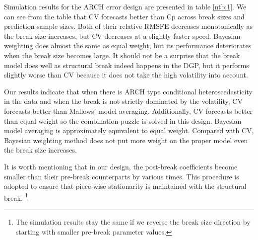 Simulation results for the ARCH error design are presented in table \ref{ntb:1}. We can see from the table that CV forecasts better than Cp across break sizes and prediction sample sizes. Both of their relative RMSFE decreases monotonically as the break size increases, but CV decreases at a slightly faster speed. Bayesian weighting does almost the same as equal weight, but its performance deteriorates when the break size becomes large. It should not be a surprise that the break model does well as structural break indeed happens in the DGP, but it performs slightly worse than CV because it does not take the high volatility into account.

Our results indicate that when there is ARCH type conditional heteroscedasticity in the data and when the break is not strictly dominated by the volatility, CV forecasts better than Mallows' model averaging. Additionally, CV forecasts better than equal weight so the combination puzzle is solved in this design. Bayesian model averaging is approximately equivalent to equal weight. Compared with CV, Bayesian weighting method does not put more weight on the proper model even the break size increases.

It is worth mentioning that in our design, the post-break coefficients become smaller than their pre-break counterparts by various times. This procedure is adopted to ensure that piece-wise stationarity is maintained with the structural break. \footnote{The simulation results stay the same if we reverse the break size direction by starting with smaller pre-break parameter values.}
